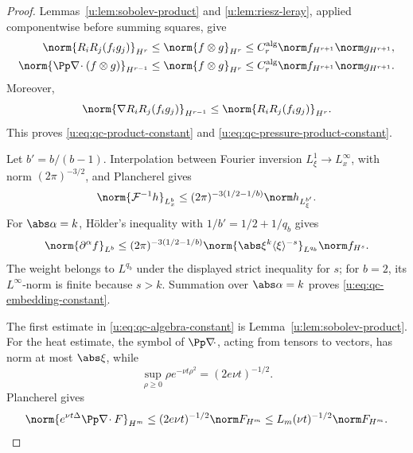 \begin{proof}
Lemmas~\ref{u:lem:sobolev-product} and \ref{u:lem:riesz-leray}, applied
componentwise before summing squares, give
\begin{align*}
 \norm{R_iR_j(f_i g_j)}_{H^r}
 &\le\norm{f\otimes g}_{H^r}
 \le C_r^{\rm alg}\norm f_{H^{r+1}}\norm g_{H^{r+1}},\\
 \norm{\Pp\nabla\!\cdot(f\otimes g)}_{H^{r-1}}
 &\le\norm{f\otimes g}_{H^r}
 \le C_r^{\rm alg}\norm f_{H^{r+1}}\norm g_{H^{r+1}}.
\end{align*}
Moreover,
\[
 \norm{\nabla R_iR_j(f_i g_j)}_{H^{r-1}}
 \le\norm{R_iR_j(f_i g_j)}_{H^r}.
\]
This proves \eqref{u:eq:qc-product-constant} and
\eqref{u:eq:qc-pressure-product-constant}.

Let \(b'=b/(b-1)\).  Interpolation between Fourier inversion
\(L^1_\xi\to L^\infty_x\), with norm \((2\pi)^{-3/2}\), and Plancherel
gives
\[
 \norm{\mathcal F^{-1}h}_{L^b_x}
 \le(2\pi)^{-3(1/2-1/b)}\norm h_{L^{b'}_\xi}.
\]
For \(\abs\alpha=k\), H\"older's inequality with
\(1/b'=1/2+1/q_b\) gives
\[
 \norm{\partial^\alpha f}_{L^b}
 \le(2\pi)^{-3(1/2-1/b)}
 \norm{\abs\xi^k\langle\xi\rangle^{-s}}_{L^{q_b}}
 \norm f_{H^s}.
\]
The weight belongs to \(L^{q_b}\) under the displayed strict inequality
for \(s\); for \(b=2\), its \(L^\infty\)-norm is finite because \(s>k\).
Summation over \(\abs\alpha=k\) proves
\eqref{u:eq:qc-embedding-constant}.

The first estimate in \eqref{u:eq:qc-algebra-constant} is
Lemma~\ref{u:lem:sobolev-product}.  For the heat estimate, the symbol of
\(\Pp\nabla\!\cdot\), acting from tensors to vectors, has norm at most
\(\abs\xi\), while
\[
 \sup_{\rho\ge0}\rho e^{-\nu t\rho^2}=(2e\nu t)^{-1/2}.
\]
Plancherel gives
\[
 \norm{e^{\nu t\Delta}\Pp\nabla\!\cdot F}_{H^m}
 \le(2e\nu t)^{-1/2}\norm F_{H^m}
 \le L_m(\nu t)^{-1/2}\norm F_{H^m}.
\]
\end{proof}

